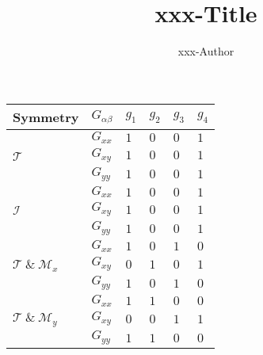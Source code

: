 \documentclass{article}
\title{xxx-Title}
\author{xxx-Author}
\begin{document}
\begin{table}
\begin{center}
\begin{tabular}{ p{1.6cm}<{\centering} | p{1.2cm}<{\centering} | p{0.8cm}<{\centering} | p{0.8cm}<{\centering} | p{0.8cm}<{\centering} | p{0.8cm}<{\centering} }
	\hline\hline
	Symmetry & $G_{\alpha\beta}$ & $g_1$ & $g_2$ & $g_3$ & $g_4$ \\
	\hline
	\multirow{3}{*}{$\mathcal{T}$} & $G_{xx}$ & $1$ & $0$ & $0$ & $1$ \\
	\cline{2-6}
	& $G_{xy}$ & $1$ & $0$ & $0$ & $1$ \\
	\cline{2-6}
	& $G_{yy}$ & $1$ & $0$ & $0$ & $1$ \\
	\hline
	\multirow{3}{*}{$\mathcal{I}$} & $G_{xx}$ & $1$ & $0$ & $0$ & $1$ \\
	\cline{2-6}
	& $G_{xy}$ & $1$ & $0$ & $0$ & $1$ \\
	\cline{2-6}
	& $G_{yy}$ & $1$ & $0$ & $0$ & $1$ \\
	\hline
	\multirow{3}{*}{$\mathcal{T}~\&~\mathcal{M}_x$} & $G_{xx}$ & $1$ & $0$ & $1$ & $0$ \\
	\cline{2-6}
	& $G_{xy}$ & $0$ & $1$ & $0$ & $1$ \\
	\cline{2-6}
	& $G_{yy}$ & $1$ & $0$ & $1$ & $0$ \\
	\hline
	\multirow{3}{*}{$\mathcal{T}~\&~\mathcal{M}_y$} & $G_{xx}$ & $1$ & $1$ & $0$ & $0$ \\
	\cline{2-6}
	& $G_{xy}$ & $0$ & $0$ & $1$ & $1$ \\
	\cline{2-6}
	& $G_{yy}$ & $1$ & $1$ & $0$ & $0$ \\
	\hline\hline
\end{tabular}
\end{center}
\end{table}
\end{document}
